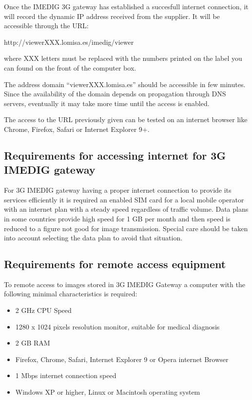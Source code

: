 \documentclass{plantilla-manual-usuario-en}
\begin{document}
Once the IMEDIG 3G gateway has established a succesfull internet connection, it will record the dynamic IP address received from the supplier. It will be accessible through the URL:

http://viewerXXX.lomisa.es/imedig/viewer

where XXX letters must be replaced with the numbers printed on the label you can found on the front of the computer box.

The address domain ``viewerXXX.lomisa.es'' should be accessible in few minutes. Since the availability of the domain depends on propagation through DNS servers, eventually it may take more time until the access is enabled.  

The access to the URL previously given can be tested on an internet browser like Chrome, Firefox, Safari or Internet Explorer 9+.

\subsection{Requirements for accessing internet for 3G IMEDIG gateway}

For 3G IMEDIG gateway having a proper internet connection to provide its services efficiently it is required an enabled SIM card for a local mobile operator with an internet plan with a steady speed regardless of traffic volume. Data plans in some countries provide high speed for 1 GB per month and then speed is reduced to a figure not good for image transmission. Special care should be taken into account selecting the data plan to avoid that situation.  

\subsection{Requirements for remote access equipment}

To remote access to images stored in 3G IMEDIG Gateway a computer with the following minimal characteristics is required:

\begin{itemize}
\item 2 GHz CPU Speed
\item 1280 x 1024 pixels resolution monitor, suitable for medical diagnosis
\item 2 GB RAM
\item Firefox, Chrome, Safari, Internet Explorer 9 or Opera internet Browser
\item 1 Mbps internet connection speed
\item Windows XP or higher, Linux or Macintosh operating system
\end{itemize}
\end{document}
